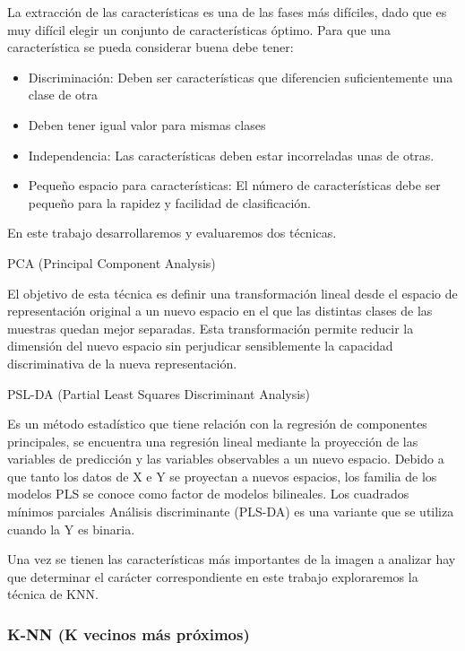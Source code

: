 La extracción de las características es una de las fases  más difíciles, dado que es muy difícil elegir un conjunto de características óptimo. 
Para que una característica se pueda considerar buena debe tener: 
\begin{itemize}
\item Discriminación: Deben  ser características que diferencien suficientemente una clase de otra
\item Deben tener igual valor para mismas clases 
\item Independencia: Las características deben estar incorreladas unas de otras. 
\item Pequeño espacio para características: El número de características debe ser pequeño para la rapidez y facilidad de clasificación. 
\end{itemize}

En este trabajo desarrollaremos y evaluaremos dos técnicas.


{\ttfamily PCA (Principal Component Analysis)} 

El objetivo de esta técnica es definir una transformación lineal desde el espacio de representación original a un nuevo espacio en el que las distintas clases de las muestras quedan mejor separadas.
Esta transformación permite reducir la dimensión del nuevo espacio sin perjudicar sensiblemente la capacidad discriminativa de la nueva representación. 

{\ttfamily PSL-DA (Partial Least Squares Discriminant Analysis)} 

Es un método estadístico que tiene relación con la regresión de componentes principales, se encuentra una regresión lineal mediante la proyección de las variables de predicción y las variables observables a un nuevo espacio. Debido a que tanto los datos de X e Y se proyectan a nuevos espacios, los familia de los modelos PLS se conoce como factor de modelos bilineales. Los cuadrados mínimos parciales Análisis discriminante (PLS-DA) es una variante que se utiliza cuando la Y es binaria.



Una  vez  se  tienen  las  características  más  importantes de la imagen a analizar hay que determinar el  carácter correspondiente en este trabajo exploraremos la técnica de KNN.


\subsubsection{ K-NN (K vecinos más próximos)}

